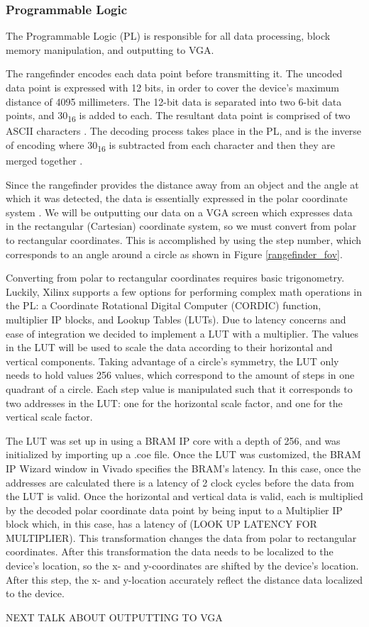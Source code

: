 \subsubsection{Programmable Logic}
The Programmable Logic (PL) is responsible for all data processing, block memory manipulation, and outputting to VGA.
\par
The rangefinder encodes each data point before transmitting it. The uncoded data point is expressed with 12 bits, in order to cover the device's maximum distance of 4095 millimeters. The 12-bit data is separated into two 6-bit data points, and 30\textsubscript{16} is added to each. The resultant data point is comprised of two ASCII characters \cite{ascii}. The decoding process takes place in the PL, and is the inverse of encoding where 30\textsubscript{16} is subtracted from each character and then they are merged together \cite{urg04lx_datasheet}.
\par
Since the rangefinder provides the distance away from an object and the angle at which it was detected, the data is essentially expressed in the polar coordinate system \cite{polar_coordinates}. We will be outputting our data on a VGA screen which expresses data in the rectangular (Cartesian) coordinate system, so we must convert from polar to rectangular coordinates. This is accomplished by using the step number, which corresponds to an angle around a circle as shown in Figure \ref{rangefinder_fov}.
\par
Converting from polar to rectangular coordinates requires basic trigonometry. Luckily, Xilinx supports a few options for performing complex math operations in the PL: a Coordinate Rotational Digital Computer (CORDIC) function, multiplier IP blocks, and Lookup Tables (LUTs). Due to latency concerns and ease of integration we decided to implement a LUT with a multiplier. The values in the LUT will be used to scale the data according to their horizontal and vertical components. Taking advantage of a circle's symmetry, the LUT only needs to hold values 256 values, which correspond to the amount of steps in one quadrant of a circle. Each step value is manipulated such that it corresponds to two addresses in the LUT: one for the horizontal scale factor, and one for the vertical scale factor.
\par
The LUT was set up in using a BRAM IP core with a depth of 256, and was initialized by importing up a .coe file. Once the LUT was customized, the BRAM IP Wizard window in Vivado specifies the BRAM's latency. In this case, once the addresses are calculated there is a latency of 2 clock cycles before the data from the LUT is valid. Once the horizontal and vertical data is valid, each is multiplied by the decoded polar coordinate data point by being input to a Multiplier IP block which, in this case, has a latency of (LOOK UP LATENCY FOR MULTIPLIER). This transformation changes the data from polar to rectangular coordinates. After this transformation the data needs to be localized to the device's location, so the x- and y-coordinates are shifted by the device's location. After this step, the x- and y-location accurately reflect the distance data localized to the device.
\par
\par
\par
NEXT TALK ABOUT OUTPUTTING TO VGA

